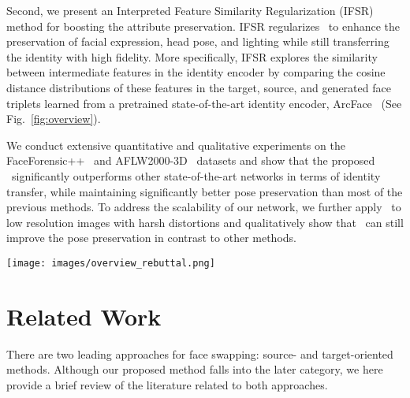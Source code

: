 \documentclass[10pt,twocolumn,letterpaper]{article}
\newcommand{\fti}[1]{\textit{FaceDancer}{#1}}
\begin{document}
Second, we present an Interpreted Feature Similarity Regularization (IFSR) method  for boosting the attribute preservation.
IFSR regularizes \fti~to  enhance the preservation of facial expression, head pose, and lighting while still transferring the identity with high fidelity. 
More specifically, IFSR explores the similarity between intermediate features in the identity encoder  by comparing the  cosine distance distributions of these features in the target, source, and generated face triplets learned from
a pretrained state-of-the-art identity encoder, ArcFace~\cite{arcface} (See Fig.~\ref{fig:overview}).

We conduct extensive quantitative and qualitative experiments on the FaceForensic++~\cite{faceforensics++} and AFLW2000-3D~\cite{aflw2000} datasets and show that the proposed \fti~significantly outperforms other state-of-the-art networks in terms of identity transfer, while maintaining significantly better pose preservation than most of the previous  methods.
To address the scalability of our network, we further apply \fti~to low resolution images with harsh distortions and qualitatively show that \fti~can still  improve the pose preservation in contrast to other   methods.


\begin{figure*}[!t]
\centering
\texttt{[image: images/overview\_rebuttal.png]}
\caption{Overview of our proposed single-stage face swapping network \fti. Left: The information flow in \fti~during training. Black lines indicate standard information flow, while red lines are the cycle consistency loss information flow and dashed lines represent inputs for losses (Section \ref{sec:losses}). Note that, the ArcFace model has two instances just to avoid having otherwise multiple intersecting arrows in the figure. Right: RB stands for ResBlock.  is the source face,  is the target face,  is the changed face,  is the identity vector extracted from ArcFace,  is the mapped identity vector,  is an incoming feature map, and  is a skip connection feature map. 
The layer Resample represents either an average pooling operation abbreviated as \emph{'down'} or a bilinear upsampling indicated as \emph{'up'} or an identity function shown as \emph{'none'}.
The layer Concat RB concatenates  and  without the  AFFA module. }
\label{fig:overview}
\end{figure*}




\section{Related Work}
There are two leading approaches for face swapping: source- and target-oriented methods. Although our proposed method falls into the later category, we here provide a brief review of the literature related to both approaches. 
\end{document}
